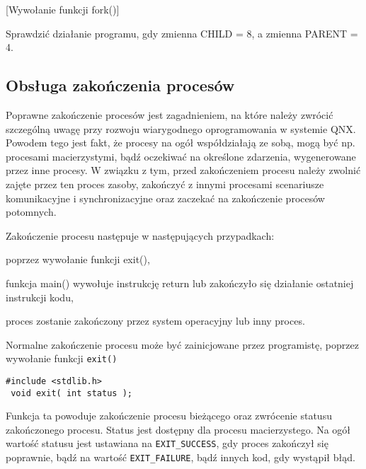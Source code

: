 \begin{example}{[Wywołanie funkcji fork()]}
  \label{ex:HP9M8}
  

  Sprawdzić działanie programu, gdy zmienna CHILD = 8, a zmienna PARENT = 4.
\end{example}

\subsection{Obsługa zakończenia procesów}

Poprawne zakończenie procesów jest zagadnieniem, na które należy zwrócić
szczególną uwagę przy rozwoju wiarygodnego oprogramowania w systemie QNX.
Powodem tego jest fakt, że procesy na ogół współdziałają ze sobą, mogą być np.
procesami macierzystymi, bądź oczekiwać na określone zdarzenia, wygenerowane
przez inne procesy. W związku z tym, przed zakończeniem procesu należy zwolnić
zajęte przez ten proces zasoby, zakończyć z innymi procesami scenariusze
komunikacyjne i synchronizacyjne oraz zaczekać na zakończenie procesów
potomnych.

Zakończenie procesu następuje w następujących przypadkach:
\begin{myitemize}
  \item poprzez wywołanie funkcji exit(),
  \item funkcja main() wywołuje instrukcję return lub zakończyło się działanie
        ostatniej instrukcji kodu,
  \item proces zostanie zakończony przez system operacyjny lub inny proces.
\end{myitemize}

Normalne zakończenie procesu może być zainicjowane przez programistę, poprzez
wywołanie funkcji \texttt{exit()}

\begin{lstlisting}[style=MyCStyle]
 #include <stdlib.h>
 void exit( int status );
\end{lstlisting}

Funkcja ta powoduje zakończenie procesu bieżącego oraz zwrócenie statusu
zakończonego procesu.  Status jest dostępny dla procesu macierzystego. Na ogół
wartość statusu jest ustawiana na \texttt{EXIT\_SUCCESS}, gdy proces zakończył
się poprawnie, bądź na wartość \texttt{EXIT\_FAILURE}, bądź innych kod, gdy
wystąpił błąd.

